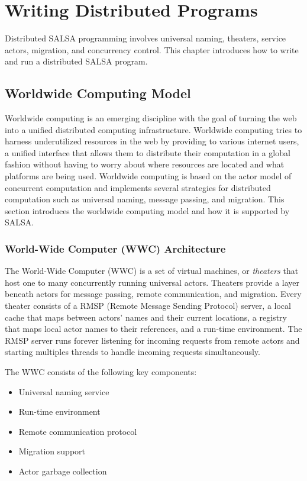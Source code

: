 \chapter{Writing Distributed Programs}
\label{Writing Distributed Programs}
Distributed SALSA programming involves universal naming, theaters,
service actors, migration, and concurrency control. This chapter
introduces how to write and run a distributed SALSA program.

\section{Worldwide Computing Model}
\label{Worldwide Computing Model}
Worldwide computing is an emerging discipline with the goal of 
turning the web into a unified distributed computing infrastructure. 
Worldwide computing tries 
to harness underutilized resources in the web by providing to various 
internet users, a unified interface that allows them to distribute their 
computation in a global fashion without having to worry about where resources 
are located and what platforms are being used. Worldwide computing is based on 
the actor model of concurrent computation and implements several strategies for 
distributed computation such as universal naming, message passing, and migration. 
This section introduces the worldwide computing model 
and how it is supported by SALSA.

\subsection{World-Wide Computer (WWC) Architecture}
The World-Wide Computer (WWC) is a set of virtual machines, or \textit{theaters} that host 
one to many concurrently running universal actors. Theaters provide a layer 
beneath actors for message passing, remote communication, and migration. Every theater 
consists of a RMSP (Remote Message Sending Protocol) server, a local cache 
that maps between actors' names and their current locations, a registry that 
maps local actor names to their references, and a run-time environment. 
The RMSP server runs forever listening for incoming requests from remote 
actors and starting multiples threads to handle incoming requests simultaneously.

The WWC consists of the following key components:
\begin{itemize}
\item Universal naming service
\item Run-time environment
\item Remote communication protocol
\item Migration support
\item Actor garbage collection
\end{itemize}


